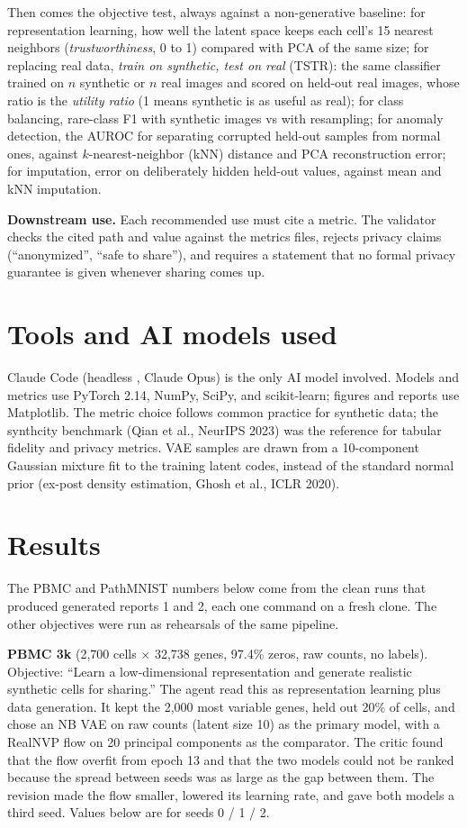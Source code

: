 \documentclass[10pt]{article}
\newcommand{\code}[1]{\texttt{\detokenize{#1}}}
\begin{document}
Then comes the objective test, always against a non-generative baseline: for representation learning, how well the latent
space keeps each cell's 15 nearest neighbors (\emph{trustworthiness}, 0 to 1) compared with PCA of the same size; for
replacing real data, \emph{train on synthetic, test on real} (TSTR): the same classifier trained on $n$ synthetic or $n$
real images and scored on held-out real images, whose ratio is the \emph{utility ratio} (1 means synthetic is as useful as
real); for class balancing, rare-class F1 with synthetic images vs with resampling; for anomaly detection, the AUROC for separating corrupted held-out samples from normal ones, against $k$-nearest-neighbor (kNN)
distance and PCA reconstruction error; for imputation, error on deliberately hidden held-out values, against mean and kNN
imputation.

\textbf{Downstream use.} Each recommended use must cite a metric. The validator checks the cited path and value against
the metrics files, rejects privacy claims (``anonymized'', ``safe to share''), and requires a statement that no formal
privacy guarantee is given whenever sharing comes up.

\section{Tools and AI models used}

Claude Code (headless \code{claude -p}, Claude Opus) is the only AI model involved. Models and metrics use PyTorch 2.14,
NumPy, SciPy, and scikit-learn; figures and reports use Matplotlib. The metric choice follows common practice for
synthetic data; the synthcity benchmark (Qian et al., NeurIPS 2023) was the reference for tabular fidelity and privacy
metrics. VAE samples are drawn from a 10-component Gaussian mixture fit to the training latent codes, instead of the
standard normal prior (ex-post density estimation, Ghosh et al., ICLR 2020).

\section{Results}

The PBMC and PathMNIST numbers below come from the clean runs that produced generated reports 1 and 2, each one
\code{./run.sh} command on a fresh clone. The other objectives were run as rehearsals of the same pipeline.

\textbf{PBMC 3k} (2,700 cells $\times$ 32,738 genes, 97.4\% zeros, raw counts, no labels). Objective: ``Learn a
low-dimensional representation and generate realistic synthetic cells for sharing.'' The agent read this as
representation learning plus data generation. It kept the 2,000 most variable genes, held out 20\% of cells, and chose an
NB VAE on raw counts (latent size 10) as the primary model, with a RealNVP flow on 20 principal components as the
comparator. The critic found that the flow overfit from epoch 13 and that the two models could not be ranked because
the spread between seeds was as large as the gap between them. The revision made the flow smaller, lowered its learning
rate, and gave both models a third seed. Values below are for seeds 0 / 1 / 2.
\end{document}
